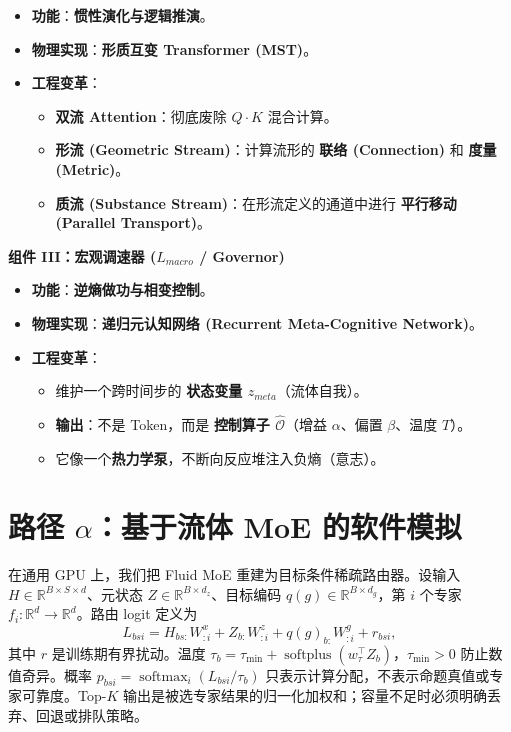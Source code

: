\begin{itemize}
    \item   \textbf{功能}：\textbf{惯性演化与逻辑推演}。
    \item   \textbf{物理实现}：\textbf{形质互变 Transformer (MST)}。
    \item   \textbf{工程变革}：
    \begin{itemize}
        \item   \textbf{双流 Attention}：彻底废除 $Q \cdot K$ 混合计算。
        \item   \textbf{形流 (Geometric Stream)}：计算流形的 \textbf{联络 (Connection)} 和 \textbf{度量 (Metric)}。
        \item   \textbf{质流 (Substance Stream)}：在形流定义的通道中进行 \textbf{平行移动 (Parallel Transport)}。
    \end{itemize}
\end{itemize}


\textbf{组件 III：宏观调速器 ($L_{macro}$ / Governor)}

\begin{itemize}
    \item   \textbf{功能}：\textbf{逆熵做功与相变控制}。
    \item   \textbf{物理实现}：\textbf{递归元认知网络 (Recurrent Meta-Cognitive Network)}。
    \item   \textbf{工程变革}：
    \begin{itemize}
        \item   维护一个跨时间步的 \textbf{状态变量 $z_{meta}$}（流体自我）。
        \item   \textbf{输出}：不是 Token，而是 \textbf{控制算子 $\hat{\mathcal{O}}$}（增益 $\alpha$、偏置 $\beta$、温度 $T$）。
        \item   它像一个\textbf{热力学泵}，不断向反应堆注入负熵（意志）。
    \end{itemize}
\end{itemize}

\section{路径 \texorpdfstring{$\alpha$}{α}：基于流体 MoE 的软件模拟}
\label{sec:section_2760}

在通用 GPU 上，我们把 Fluid MoE 重建为目标条件稀疏路由器。设输入 $H\in\mathbb{R}^{B\times S\times d}$、元状态 $Z\in\mathbb{R}^{B\times d_z}$、目标编码 $q(g)\in\mathbb{R}^{B\times d_g}$，第 $i$ 个专家 $f_i:\mathbb{R}^{d}\to\mathbb{R}^{d}$。路由 logit 定义为
\begin{equation}
L_{bsi}=H_{bs:}W^x_{:i}+Z_{b:}W^z_{:i}+q(g)_{b:}W^g_{:i}+r_{bsi},
\end{equation}
其中 $r$ 是训练期有界扰动。温度 $\tau_b=\tau_{\min}+\operatorname{softplus}(w_\tau^\top Z_b)$，$\tau_{\min}>0$ 防止数值奇异。概率 $p_{bsi}=\operatorname{softmax}_i(L_{bsi}/\tau_b)$ 只表示计算分配，不表示命题真值或专家可靠度。Top-$K$ 输出是被选专家结果的归一化加权和；容量不足时必须明确丢弃、回退或排队策略。

